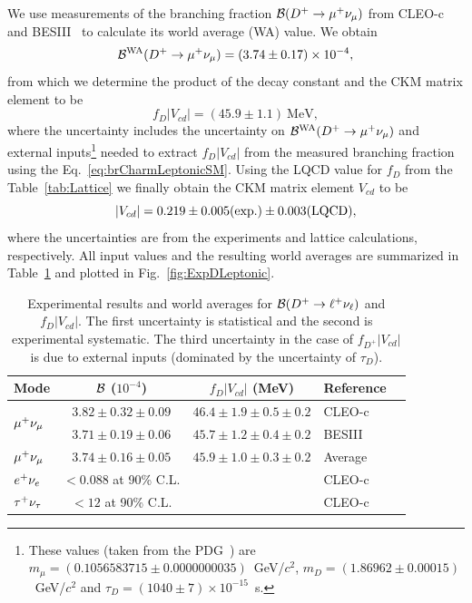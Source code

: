 We use measurements of the branching fraction ${\cal B}(D^+\to\mu^+\nu_{\mu})$ from \mbox{CLEO-c}~\cite{Eisenstein:2008aa} and 
BESIII~\cite{Ablikim:2013uvu} to calculate its world average (WA) value. We obtain
\[
 {\cal B}^{\rm WA}(D^+\to\mu^+\nu_{\mu}) = (3.74\pm0.17)\times10^{-4},
\]
from which we determine the product of the decay constant and the CKM matrix element to be
\begin{equation}
 f_{D}|V_{cd}| = \left(45.9\pm1.1\right)~\mbox{MeV},
 \label{eq:expFDVCD}
\end{equation}
where the uncertainty includes the uncertainty on ${\cal B}^{\rm WA}(D^+\to\mu^+\nu_{\mu})$ and external inputs\footnote{These values (taken from the PDG~\cite{PDG_2012}) are
$m_{\mu} = (0.1056583715\pm0.0000000035)$~GeV/$c^2$, $m_D = (1.86962\pm0.00015)$~GeV/$c^2$ 
and $\tau_D = (1040\pm7)\times 10^{-15}$~s.} needed to extract $f_{D}|V_{cd}|$ from the 
measured branching fraction using the Eq.~\ref{eq:brCharmLeptonicSM}. 
Using the LQCD value for $f_D$ from the Table~\ref{tab:Lattice} we 
finally obtain the CKM matrix element $V_{cd}$ to be
\[
 |V_{cd}| = 0.219\pm0.005(\rm exp.)\pm0.003(\rm LQCD),
\]
where the uncertainties are from the experiments and lattice calculations, respectively. All input values
and the resulting world averages are summarized in Table~\ref{tab:DExpLeptonic} and plotted in 
Fig.~\ref{fig:ExpDLeptonic}.
\begin{table}[t!]
\caption{Experimental results and world averages for ${\cal{B}}(D^+\to \ell^+\nu_{\ell})$ and $f_{D}|V_{cd}|$.
The first uncertainty is statistical and the second is experimental systematic. The third uncertainty in the case
of $f_{D^+}|V_{cd}|$ is due to external inputs (dominated by the uncertainty of $\tau_D$).
\label{tab:DExpLeptonic}}
\begin{center}
\begin{tabular}{lccll}
\toprule
\rowcolor{Gray} Mode 	& ${\cal{B}}$ ($10^{-4}$)	& $f_{D}|V_{cd}|$ (MeV)		& Reference & \\ 
\midrule
\multirow{2}{*}{$\mu^+\nu_{\mu}$} & $3.82\pm0.32\pm 0.09$ 	& $46.4\pm1.9\pm0.5\pm0.2$	& CLEO-c & \cite{Eisenstein:2008aa}\\ 
			& $3.71\pm0.19\pm 0.06$ 	& $45.7\pm1.2\pm0.4\pm0.2$	& BESIII & \cite{Ablikim:2013uvu}\\
\midrule
\rowcolor{Gray}$\mu^+\nu_{\mu}$ 	& $3.74\pm0.16\pm 0.05$		& $45.9\pm1.0\pm0.3\pm0.2$	& Average & \\
\midrule
$e^+\nu_{e}$	 		& {$<0.088$ at 90\% C.L.}	&& CLEO-c & \cite{Eisenstein:2008aa}\\
\midrule
$\tau^+\nu_{\tau}$ 		& {$<12$ at 90\% C.L.}		&& CLEO-c & \cite{Eisenstein:2008aa}
\\ \bottomrule
\end{tabular}
\end{center}
\end{table}
